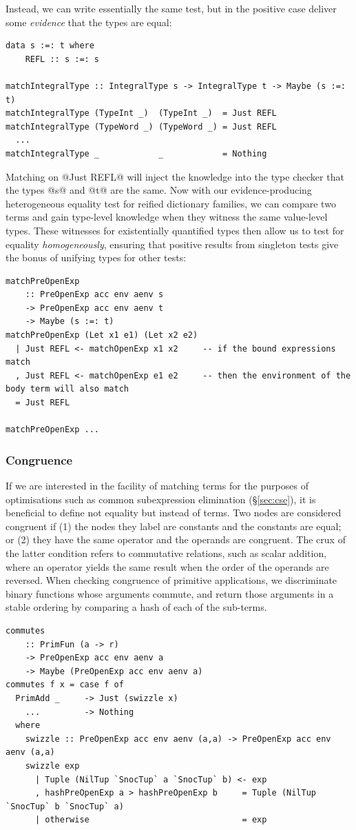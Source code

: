 Instead, we can write essentially the same test, but in the positive case
deliver some \emph{evidence} that the types are equal:
%
\begin{lstlisting}[style=haskell]
data s :=: t where
    REFL :: s :=: s

matchIntegralType :: IntegralType s -> IntegralType t -> Maybe (s :=: t)
matchIntegralType (TypeInt _)  (TypeInt _)  = Just REFL
matchIntegralType (TypeWord _) (TypeWord _) = Just REFL
  ...
matchIntegralType _            _            = Nothing
\end{lstlisting}
%
Matching on @Just REFL@ will inject the knowledge into the type
checker that the types @s@ and @t@ are the same. Now with our
evidence-producing heterogeneous equality test for reified dictionary families,
we can compare two terms and gain type-level knowledge when they witness the
same value-level types. These witnesses for existentially quantified types then
allow us to test for equality \emph{homogeneously}, ensuring that positive
results from singleton tests give the bonus of unifying types for other tests:
%
\begin{lstlisting}[style=haskell]
matchPreOpenExp
    :: PreOpenExp acc env aenv s
    -> PreOpenExp acc env aenv t
    -> Maybe (s :=: t)
matchPreOpenExp (Let x1 e1) (Let x2 e2)
  | Just REFL <- matchOpenExp x1 x2     -- if the bound expressions match
  , Just REFL <- matchOpenExp e1 e2     -- then the environment of the body term will also match
  = Just REFL

matchPreOpenExp ...
\end{lstlisting}


\subsubsection{Congruence}

If we are interested in the facility of matching terms for the purposes of
optimisations such as common subexpression elimination (\S\ref{sec:cse}), it is
beneficial to define not equality but instead  of terms. Two
nodes are considered congruent if (1) the nodes they label are constants and the
constants are equal; or (2) they have the same operator and the operands are
congruent. The crux of the latter condition refers to commutative relations,
such as scalar addition, where an operator yields the same result when the order
of the operands are reversed. When checking congruence of primitive applications,
we discriminate binary functions whose arguments commute, and return those
arguments in a stable ordering by comparing a hash of each of the sub-terms.
%
\begin{lstlisting}[style=haskell]
commutes
    :: PrimFun (a -> r)
    -> PreOpenExp acc env aenv a
    -> Maybe (PreOpenExp acc env aenv a)
commutes f x = case f of
  PrimAdd _     -> Just (swizzle x)
    ...         -> Nothing
  where
    swizzle :: PreOpenExp acc env aenv (a,a) -> PreOpenExp acc env aenv (a,a)
    swizzle exp
      | Tuple (NilTup `SnocTup` a `SnocTup` b) <- exp
      , hashPreOpenExp a > hashPreOpenExp b     = Tuple (NilTup `SnocTup` b `SnocTup` a)
      | otherwise                               = exp
\end{lstlisting}

